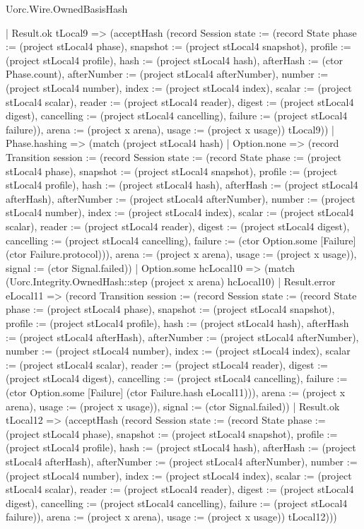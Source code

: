 \begin{lexlean}{Uorc.Wire.OwnedBasisHash}
\begin{semanticmodule}
{        | Result.ok tLocal9 => (acceptHash (record Session {state := (record State {phase := (project stLocal4 phase), snapshot := (project stLocal4 snapshot), profile := (project stLocal4 profile), hash := (project stLocal4 hash), afterHash := (ctor Phase.count), afterNumber := (project stLocal4 afterNumber), number := (project stLocal4 number), index := (project stLocal4 index), scalar := (project stLocal4 scalar), reader := (project stLocal4 reader), digest := (project stLocal4 digest), cancelling := (project stLocal4 cancelling), failure := (project stLocal4 failure)}), arena := (project x arena), usage := (project x usage)}) tLocal9))
      | Phase.hashing => (match (project stLocal4 hash)
        | Option.none => (record Transition {session := (record Session {state := (record State {phase := (project stLocal4 phase), snapshot := (project stLocal4 snapshot), profile := (project stLocal4 profile), hash := (project stLocal4 hash), afterHash := (project stLocal4 afterHash), afterNumber := (project stLocal4 afterNumber), number := (project stLocal4 number), index := (project stLocal4 index), scalar := (project stLocal4 scalar), reader := (project stLocal4 reader), digest := (project stLocal4 digest), cancelling := (project stLocal4 cancelling), failure := (ctor Option.some [Failure] (ctor Failure.protocol))}), arena := (project x arena), usage := (project x usage)}), signal := (ctor Signal.failed)})
        | Option.some hcLocal10 => (match (Uorc.Integrity.OwnedHash::step (project x arena) hcLocal10)
          | Result.error eLocal11 => (record Transition {session := (record Session {state := (record State {phase := (project stLocal4 phase), snapshot := (project stLocal4 snapshot), profile := (project stLocal4 profile), hash := (project stLocal4 hash), afterHash := (project stLocal4 afterHash), afterNumber := (project stLocal4 afterNumber), number := (project stLocal4 number), index := (project stLocal4 index), scalar := (project stLocal4 scalar), reader := (project stLocal4 reader), digest := (project stLocal4 digest), cancelling := (project stLocal4 cancelling), failure := (ctor Option.some [Failure] (ctor Failure.hash eLocal11))}), arena := (project x arena), usage := (project x usage)}), signal := (ctor Signal.failed)})
          | Result.ok tLocal12 => (acceptHash (record Session {state := (record State {phase := (project stLocal4 phase), snapshot := (project stLocal4 snapshot), profile := (project stLocal4 profile), hash := (project stLocal4 hash), afterHash := (project stLocal4 afterHash), afterNumber := (project stLocal4 afterNumber), number := (project stLocal4 number), index := (project stLocal4 index), scalar := (project stLocal4 scalar), reader := (project stLocal4 reader), digest := (project stLocal4 digest), cancelling := (project stLocal4 cancelling), failure := (project stLocal4 failure)}), arena := (project x arena), usage := (project x usage)}) tLocal12)))
}
\end{semanticmodule}
\end{lexlean}
